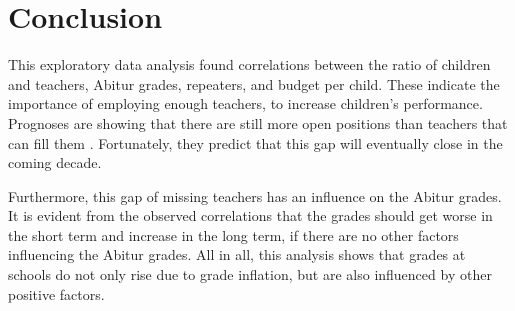 \section{Conclusion}
This exploratory data analysis found correlations between the ratio of children and teachers, Abitur grades, repeaters, and budget per child. These indicate the importance of employing enough teachers, to increase children's performance. Prognoses are  showing that there are still more open positions than teachers that can fill them \cite{kultusminister_konferenz_lehrkrafteeinstellungsbedarf_2023}. Fortunately, they predict that this gap will eventually close in the coming decade. 

Furthermore, this gap of missing teachers has an influence on the Abitur grades. It is evident from the observed correlations that the grades should get worse in the short term and increase in the long term, if there are no other factors influencing the Abitur grades. All in all, this analysis shows that grades at schools do not only rise due to grade inflation, but are also influenced by other positive factors.



